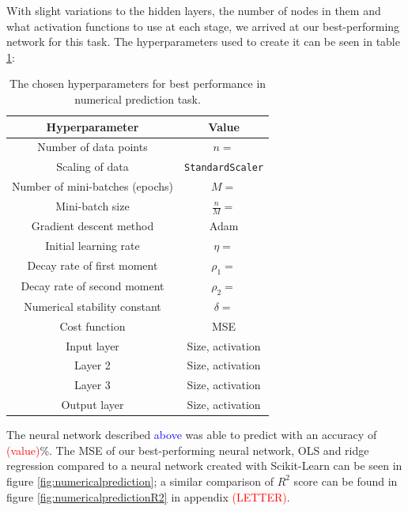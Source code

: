 With slight variations to the hidden layers, the number of nodes in them and what activation functions to use at each stage, we arrived at our best-performing network for this task. The hyperparameters used to create it can be seen in table \ref{tab:numericalprediction}: 
\begin{table}[h!]
  \centering
  \small
  \begin{tabular}{|c|c|}
    \hline
    \textbf{Hyperparameter} & \textbf{Value} \\
    \hline
    Number of data points & $n = $ \\
    \hline
    Scaling of data & \texttt{StandardScaler} \\
    \hline
    Number of mini-batches (epochs) & $M =$ \\
    \hline
    Mini-batch size & $\frac{n}{M} = $ \\
    \hline
    Gradient descent method & Adam \\
    \hline
    Initial learning rate & $\eta = $ \\
    \hline
    Decay rate of first moment & $\rho_1 =$ \\
    \hline
    Decay rate of second moment & $\rho_2 = $ \\
    \hline
    Numerical stability constant & $\delta = $ \\
    \hline
    Cost function & MSE \\
    \hline
    Input layer & Size, activation \\
    \hline
    Layer 2 & Size, activation \\
    \hline
    Layer 3 & Size, activation \\
    \hline
    Output layer & Size, activation \\
    \hline
  \end{tabular}
  \caption{The chosen hyperparameters for best performance in numerical prediction task.}
  \label{tab:numericalprediction}
\end{table}

The neural network described \textcolor{blue}{above} was able to predict with an accuracy of \textcolor{red}{(value)}\%. The MSE of our best-performing neural network, OLS and ridge regression compared to a neural network created with Scikit-Learn can be seen in figure \ref{fig:numericalprediction}; a similar comparison of $R^2$ score can be found in figure \ref{fig:numericalpredictionR2} in appendix \textcolor{red}{(LETTER)}.

